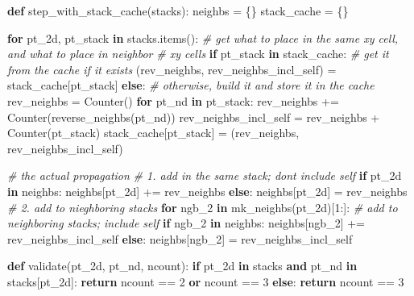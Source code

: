 \documentclass[]{article}
\newenvironment{Shaded}{}{}
\newcommand{\CommentTok}[1]{\textcolor[rgb]{0.38,0.63,0.69}{\textit{#1}}}
\newcommand{\ControlFlowTok}[1]{\textcolor[rgb]{0.00,0.44,0.13}{\textbf{#1}}}
\newcommand{\DecValTok}[1]{\textcolor[rgb]{0.25,0.63,0.44}{#1}}
\newcommand{\KeywordTok}[1]{\textcolor[rgb]{0.00,0.44,0.13}{\textbf{#1}}}
\newcommand{\NormalTok}[1]{#1}
\newcommand{\OperatorTok}[1]{\textcolor[rgb]{0.40,0.40,0.40}{#1}}
\begin{document}
\begin{Shaded}
\begin{Highlighting}[]
\KeywordTok{def}\NormalTok{ step\_with\_stack\_cache(stacks):}
\NormalTok{    neighbs }\OperatorTok{=}\NormalTok{ \{\}}
\NormalTok{    stack\_cache }\OperatorTok{=}\NormalTok{ \{\}}

    \ControlFlowTok{for}\NormalTok{ pt\_2d, pt\_stack }\KeywordTok{in}\NormalTok{ stacks.items():}
        \CommentTok{\# get what to place in the same xy cell, and what to place in neighbor}
        \CommentTok{\# xy cells}
        \ControlFlowTok{if}\NormalTok{ pt\_stack }\KeywordTok{in}\NormalTok{ stack\_cache:}
            \CommentTok{\# get it from the cache if it exists}
\NormalTok{            (rev\_neighbs, rev\_neighbs\_incl\_self) }\OperatorTok{=}\NormalTok{ stack\_cache[pt\_stack]}
        \ControlFlowTok{else}\NormalTok{:}
            \CommentTok{\# otherwise, build it and store it in the cache}
\NormalTok{            rev\_neighbs }\OperatorTok{=}\NormalTok{ Counter()}
            \ControlFlowTok{for}\NormalTok{ pt\_nd }\KeywordTok{in}\NormalTok{ pt\_stack:}
\NormalTok{                rev\_neighbs }\OperatorTok{+=}\NormalTok{ Counter(reverse\_neighbs(pt\_nd))}
\NormalTok{            rev\_neighbs\_incl\_self }\OperatorTok{=}\NormalTok{ rev\_neighbs }\OperatorTok{+}\NormalTok{ Counter(pt\_stack)}
\NormalTok{            stack\_cache[pt\_stack] }\OperatorTok{=}\NormalTok{ (rev\_neighbs, rev\_neighbs\_incl\_self)}

        \CommentTok{\# the actual propagation}
        \CommentTok{\# 1. add in the same stack; don\textquotesingle{}t include self}
        \ControlFlowTok{if}\NormalTok{ pt\_2d }\KeywordTok{in}\NormalTok{ neighbs:}
\NormalTok{            neighbs[pt\_2d] }\OperatorTok{+=}\NormalTok{ rev\_neighbs}
        \ControlFlowTok{else}\NormalTok{:}
\NormalTok{            neighbs[pt\_2d] }\OperatorTok{=}\NormalTok{ rev\_neighbs}
        \CommentTok{\# 2. add to nieghboring stacks}
        \ControlFlowTok{for}\NormalTok{ ngb\_2 }\KeywordTok{in}\NormalTok{ mk\_neighbs(pt\_2d)[}\DecValTok{1}\NormalTok{:]:}
            \CommentTok{\# add to neighboring stacks; include self}
            \ControlFlowTok{if}\NormalTok{ ngb\_2 }\KeywordTok{in}\NormalTok{ neighbs:}
\NormalTok{                neighbs[ngb\_2] }\OperatorTok{+=}\NormalTok{ rev\_neighbs\_incl\_self}
            \ControlFlowTok{else}\NormalTok{:}
\NormalTok{                neighbs[ngb\_2] }\OperatorTok{=}\NormalTok{ rev\_neighbs\_incl\_self}

    \KeywordTok{def}\NormalTok{ validate(pt\_2d, pt\_nd, ncount):}
        \ControlFlowTok{if}\NormalTok{ pt\_2d }\KeywordTok{in}\NormalTok{ stacks }\KeywordTok{and}\NormalTok{ pt\_nd }\KeywordTok{in}\NormalTok{ stacks[pt\_2d]:}
            \ControlFlowTok{return}\NormalTok{ ncount }\OperatorTok{==} \DecValTok{2} \KeywordTok{or}\NormalTok{ ncount }\OperatorTok{==} \DecValTok{3}
        \ControlFlowTok{else}\NormalTok{:}
            \ControlFlowTok{return}\NormalTok{ ncount }\OperatorTok{==} \DecValTok{3}


\end{Highlighting}
\end{Shaded}
\end{document}

